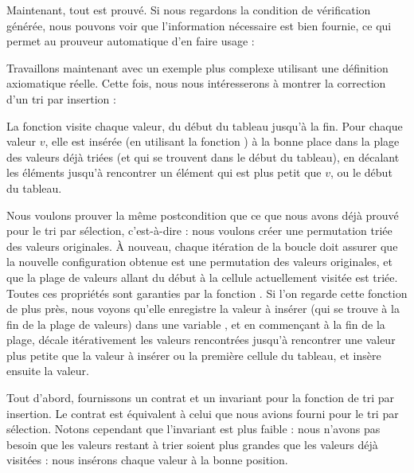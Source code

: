 


Maintenant, tout est prouvé. Si nous regardons la condition de vérification générée,
nous pouvons voir que l'information nécessaire est bien fournie, ce qui permet
au prouveur automatique d'en faire usage :






Travaillons maintenant avec un exemple plus complexe utilisant une définition
axiomatique réelle. Cette fois, nous nous intéresserons à montrer la correction
d'un tri par insertion :




La fonction  visite chaque valeur, du début du tableau
jusqu'à la fin. Pour chaque valeur $v$, elle est insérée (en utilisant la fonction
) à la bonne place dans la plage des valeurs déjà triées (et qui
se trouvent dans le début du tableau), en décalant les éléments jusqu'à
rencontrer un élément qui est plus petit que $v$, ou le début du tableau.



Nous voulons prouver la même postcondition que ce que nous avons déjà prouvé pour
le tri par sélection, c'est-à-dire : nous voulons créer une permutation triée des
valeurs originales. À nouveau, chaque itération de la boucle doit assurer que la
nouvelle configuration obtenue est une permutation des valeurs originales, et que
la plage de valeurs allant du début à la cellule actuellement visitée est triée.
Toutes ces propriétés sont garanties par la fonction . Si l'on
regarde cette fonction de plus près, nous voyons qu'elle enregistre la
valeur à insérer (qui se trouve à la fin de la plage de valeurs) dans une variable
, et en commençant à la fin de la plage, décale itérativement
les valeurs rencontrées jusqu'à rencontrer une valeur plus petite que la valeur à
insérer ou la première cellule du tableau, et insère ensuite la valeur.




Tout d'abord, fournissons un contrat et un invariant pour la fonction de tri
par insertion. Le contrat est équivalent à celui que nous avions fourni pour le
tri par sélection. Notons cependant que l'invariant est plus faible : nous
n'avons pas besoin que les valeurs restant à trier soient plus grandes que les
valeurs déjà visitées : nous insérons chaque valeur à la bonne position.



